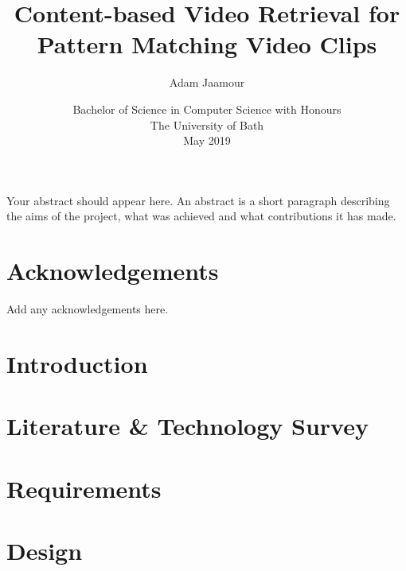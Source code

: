 \documentclass[11pt,openright,twoside,a4paper]{report}
\title{Content-based Video Retrieval for Pattern Matching Video Clips}
\author{Adam Jaamour}
\date{Bachelor of Science in Computer Science with Honours\\The University of Bath\\May 2019}
\begin{document}
\setcounter{page}{0}

\maketitle
\newpage

\newpage

\newpage

\abstract
Your abstract should appear here.  An abstract is a short
paragraph describing the aims of the project, what was
achieved and what contributions it has made.
\newpage

\setcounter{tocdepth}{3}
\tableofcontents
\newpage
\listoffigures
\newpage
\listoftables
\newpage

\chapter*{Acknowledgements}
Add any acknowledgements here.
\newpage

\setcounter{page}{1}

\chapter{Introduction}


\chapter{Literature \& Technology Survey}


\chapter{Requirements}


\chapter{Design}


\end{document}
